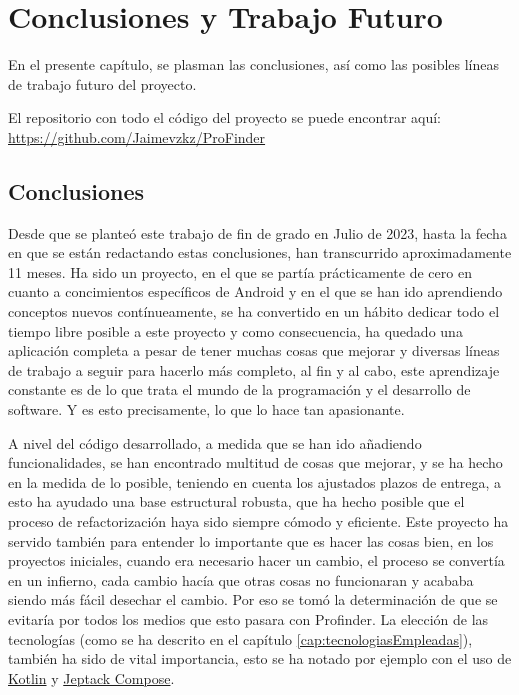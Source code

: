 \chapter{Conclusiones y Trabajo Futuro}
\label{cap:conclusiones}
En el presente capítulo, se plasman las conclusiones, así como las posibles líneas de trabajo futuro del proyecto.

El repositorio con todo el código del proyecto se puede encontrar aquí: \newline\url{https://github.com/Jaimevzkz/ProFinder}

\section{Conclusiones}
Desde que se planteó este trabajo de fin de grado en Julio de 2023, hasta la fecha en que se están redactando estas conclusiones, han transcurrido aproximadamente 11 meses. Ha sido un proyecto, en el que se partía prácticamente de cero en cuanto a concimientos específicos de Android y en el que se han ido aprendiendo conceptos nuevos contínueamente, se ha convertido en un hábito dedicar todo el tiempo libre posible a este proyecto y como consecuencia, ha quedado una aplicación completa a pesar de tener muchas cosas que mejorar y diversas líneas de trabajo a seguir para hacerlo más completo, al fin y al cabo, este aprendizaje constante es de lo que trata el mundo de la programación y el desarrollo de software. Y es esto precisamente, lo que lo hace tan apasionante.

A nivel del código desarrollado, a medida que se han ido añadiendo funcionalidades, se han encontrado multitud de cosas que mejorar, y se ha hecho en la medida de lo posible, teniendo en cuenta los ajustados plazos de entrega, a esto ha ayudado una base estructural robusta, que ha hecho posible que el proceso de refactorización haya sido siempre cómodo y eficiente. Este proyecto ha servido también para entender lo importante que es hacer las cosas bien, en los proyectos iniciales, cuando era necesario hacer un cambio, el proceso se convertía en un infierno, cada cambio hacía que otras cosas no funcionaran y acababa siendo más fácil desechar el cambio. Por eso se tomó la determinación de que se evitaría por todos los medios que esto pasara con Profinder. La elección de las tecnologías (como se ha descrito en el capítulo \ref{cap:tecnologiasEmpleadas}), también ha sido de vital importancia, esto se ha notado por ejemplo con el uso de \hyperlink{subsec:kotlin}{Kotlin} y \hyperlink{subsec:compose}{Jeptack Compose}.

